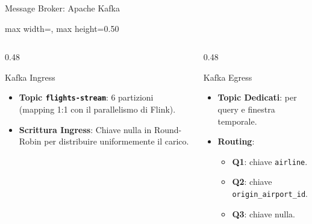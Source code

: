 \documentclass[10pt, aspectratio=169]{beamer}
\begin{document}
\begin{frame}[fragile]{Message Broker: Apache Kafka}
\begin{adjustbox}{max width=\linewidth, max height=0.50\textheight}
    \end{adjustbox}

    \vskip -0.25cm

    \begin{columns}[t]
        \begin{column}{0.48\textwidth}
            \begin{block}{Kafka Ingress}
                \footnotesize
                \begin{itemize}
                    \item \textbf{Topic \texttt{flights-stream}}: 6 partizioni (mapping 1:1 con il parallelismo di Flink).
                    \item \textbf{Scrittura Ingress}: Chiave nulla in Round-Robin per distribuire uniformemente il carico.
                \end{itemize}
            \end{block}
        \end{column}

        \begin{column}{0.48\textwidth}
            \begin{block}{Kafka Egress}
                \footnotesize
                \begin{itemize}
                    \item \textbf{Topic Dedicati}: per query e finestra temporale.
                    \item \textbf{Routing}:
                        \begin{itemize}\footnotesize
                            \item \textbf{Q1}: chiave \texttt{airline}.
                            \item \textbf{Q2}: chiave \texttt{origin\_airport\_id}.
                            \item \textbf{Q3}: chiave nulla.
                        \end{itemize}
                \end{itemize}
            \end{block}
        \end{column}
    \end{columns}
\end{frame}
\end{document}
